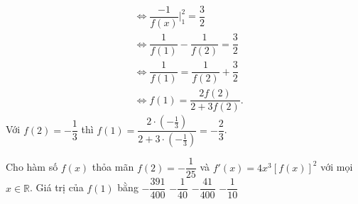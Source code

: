 \begin{ex}
{\begin{enumerate}
\begin{align*}
				       & \Leftrightarrow \dfrac{-1}{f(x)} \bigg|_1^2=\dfrac{3}{2}                             \\
				       & \Leftrightarrow \dfrac{1}{f(1)}-\dfrac{1}{f(2)}=\dfrac{3}{2}                         \\
				       & \Leftrightarrow \dfrac{1}{f(1)}=\dfrac{1}{f(2)}+\dfrac{3}{2}                         \\
				       & \Leftrightarrow f(1)=\dfrac{2f(2)}{2+3f(2)}.
			      \end{align*}
			      Với $f(2)=-\dfrac{1}{3}$ thì $f(1)=\dfrac{2\cdot\left(-\frac{1}{3}\right)}{2+3\cdot\left(-\frac{1}{3}\right)}=-\dfrac{2}{3}$.
		\end{enumerate}
	}
\end{ex}
\begin{ex}%
	Cho hàm số $f(x)$ thỏa mãn $f(2)=-\dfrac{1}{25}$ và $f'(x)=4x^3\left[f(x)\right]^2$ với mọi $x\in\mathbb{R}$. Giá trị của $f(1)$ bằng
	\choice
	{$-\dfrac{391}{400}$}
	{$-\dfrac{1}{40}$}
	{$-\dfrac{41}{400}$}
	{\True $-\dfrac{1}{10}$}
\end{ex}
